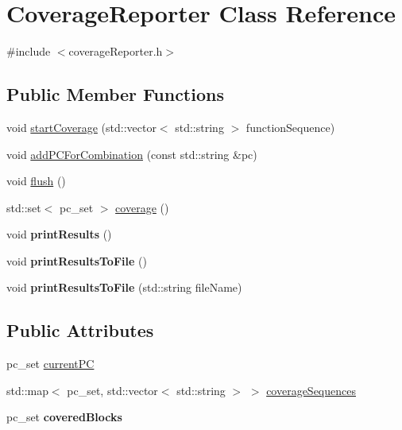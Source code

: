 \hypertarget{classCoverageReporter}{}\section{Coverage\+Reporter Class Reference}
\label{classCoverageReporter}


{\ttfamily \#include $<$coverage\+Reporter.\+h$>$}

\subsection*{Public Member Functions}
\begin{DoxyCompactItemize}
\item 
void \hyperlink{classCoverageReporter_a560eff3e34be25d1a49c37ffd99e69c1}{start\+Coverage} (std\+::vector$<$ std\+::string $>$ function\+Sequence)
\item 
void \hyperlink{classCoverageReporter_a477866b25aa53c3ebbc60de7b7863943}{add\+P\+C\+For\+Combination} (const std\+::string \&pc)
\item 
void \hyperlink{classCoverageReporter_a046428d09487a4a3d3420caf77f436df}{flush} ()
\item 
std\+::set$<$ pc\+\_\+set $>$ \hyperlink{classCoverageReporter_af515596c46758142ea7aa7dbbab47b7e}{coverage} ()
\item 
\mbox{\label{classCoverageReporter_a4c9c89e13cc4bc7f5cb26441c1e7e723}} 
void {\bfseries print\+Results} ()
\item 
\mbox{\label{classCoverageReporter_aadef25c261ffd89e68fe9e59da591247}} 
void {\bfseries print\+Results\+To\+File} ()
\item 
\mbox{\label{classCoverageReporter_aa195d96544ab9b29a6a6f7fbcb11070a}} 
void {\bfseries print\+Results\+To\+File} (std\+::string file\+Name)
\end{DoxyCompactItemize}
\subsection*{Public Attributes}
\begin{DoxyCompactItemize}
\item 
pc\+\_\+set \hyperlink{classCoverageReporter_a731717e0ad503323a0b541b8c1497080}{current\+PC}
\item 
std\+::map$<$ pc\+\_\+set, std\+::vector$<$ std\+::string $>$ $>$ \hyperlink{classCoverageReporter_a395e6d59cc394e670fff1e8a575fc329}{coverage\+Sequences}
\item 
\mbox{\label{classCoverageReporter_a180661161246c7f350d19ad4dfd82680}} 
pc\+\_\+set {\bfseries covered\+Blocks}
\end{DoxyCompactItemize}


